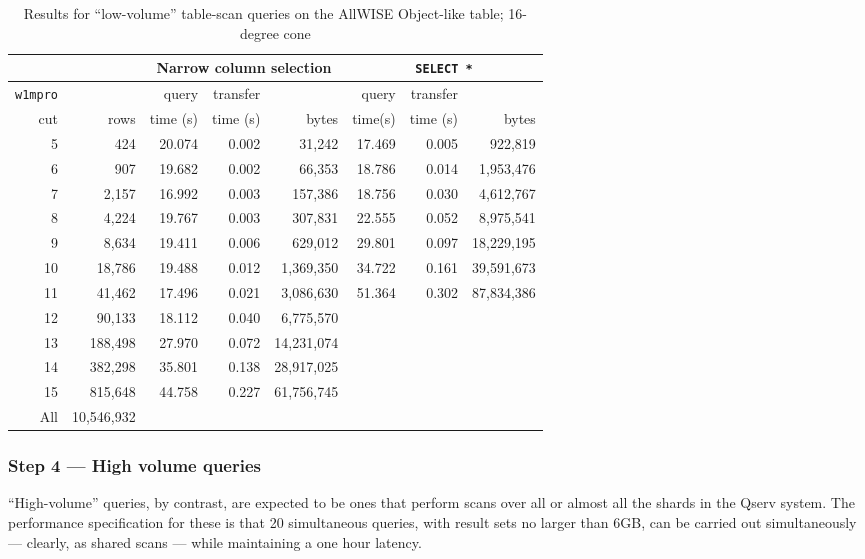 \begin{table}[h]
\centering
\begin{tabular}{r r r r r r r r}
 & & \multicolumn{3}{c}{Narrow column selection} & \multicolumn{3}{c}{\texttt{SELECT *}} \\ \hline
\texttt{w1mpro} &  & query & transfer &  & query & transfer &  \\
cut & rows & time (s) & time (s) & bytes & time(s) & time (s) & bytes \\ \hline
5 & 424 & 20.074 & 0.002 & 31,242 & 17.469 & 0.005 & 922,819 \\
6 & 907 & 19.682 & 0.002 & 66,353 & 18.786 & 0.014 & 1,953,476 \\
7 & 2,157 & 16.992 & 0.003 & 157,386 & 18.756 & 0.030 & 4,612,767 \\
8 & 4,224 & 19.767 & 0.003 & 307,831 & 22.555 & 0.052 & 8,975,541 \\
9 & 8,634 & 19.411 & 0.006 & 629,012 & 29.801 & 0.097 & 18,229,195 \\
10 & 18,786 & 19.488 & 0.012 & 1,369,350 & 34.722 & 0.161 & 39,591,673 \\
11 & 41,462 & 17.496 & 0.021 & 3,086,630 & 51.364 & 0.302 & 87,834,386 \\
12 & 90,133 & 18.112 & 0.040 & 6,775,570 \\
13 & 188,498 & 27.970 & 0.072 & 14,231,074 \\
14 & 382,298 & 35.801 & 0.138 & 28,917,025 \\
15 & 815,648 & 44.758 & 0.227 & 61,756,745 \\
All & 10,546,932 \\
\end{tabular}
\caption{Results for ``low-volume'' table-scan queries on the AllWISE Object-like table; 16-degree cone}
\label{tab:lsp-00-10-16-degree-scans}
\end{table}

\subsubsection{Step 4 --- High volume queries}

``High-volume'' queries, by contrast, are expected to be ones that perform scans over all or almost all the shards in the Qserv system.
The performance specification for these is that 20 simultaneous queries, with result sets no larger than 6GB,
can be carried out simultaneously --- clearly, as shared scans --- while maintaining a one hour latency.

